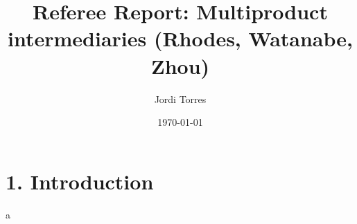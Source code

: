 \documentclass{article}
\begin{document}
\title{Referee Report: Multiproduct intermediaries (Rhodes, Watanabe, Zhou)}
\author{Jordi Torres}
\date{\today}


\maketitle
\section*{1. Introduction}

a
\end{document}
